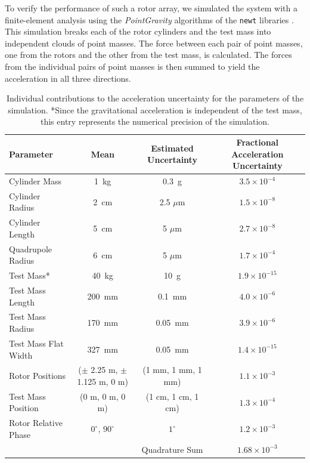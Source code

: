 \documentclass[superscriptaddress, twocolumn, prd]{revtex4-1}
\begin{document}
To verify the performance of such a rotor array, we simulated the system with a finite-element analysis using the \textit{PointGravity} algorithms of the \texttt{newt} libraries \cite{Hagedorn, pgURL}. This simulation breaks each of the rotor cylinders and the test mass into independent clouds of point masses. The force between each pair of point masses, one from the rotors and the other from the test mass, is calculated. The forces from the individual pairs of point masses is then summed to yield the acceleration in all three directions. 
\begin{widetext}
\begingroup
\setlength{\tabcolsep}{10pt} %
\renewcommand{\arraystretch}{1.5} %

\begin{table}[h!]
\begin{center}
\begin{tabular}{ |l|c|c|c| }
\hline
 Parameter & Mean & Estimated Uncertainty & Fractional Acceleration Uncertainty\\
 \hline

Cylinder Mass & 1~kg & 0.3~g & $3.5\times10^{-4}$\\
Cylinder Radius & 2~cm & 2.5 $\mu$m & $1.5\times10^{-8}$\\
Cylinder Length & 5~cm & 5 $\mu$m & $2.7\times10^{-8}$\\
Quadrupole Radius & 6~cm & 5 $\mu$m &$1.7\times10^{-4}$\\
Test Mass* & 40~kg & 10~g & $1.9\times10^{-15}$\\
Test Mass Length & 200~mm & 0.1~mm& $4.0\times10^{-6}$\\
Test Mass Radius & 170~mm & 0.05~mm& $3.9\times10^{-6}$\\
Test Mass Flat Width & 327~mm & 0.05~mm&$1.4\times10^{-15}$\\
Rotor Positions & ($\pm$ 2.25 m, $\pm$ 1.125 m, 0 m) & (1 mm, 1 mm, 1 mm) &$1.1\times10^{-3}$\\
Test Mass Position & (0 m, 0 m, 0 m) & (1 cm, 1 cm, 1 cm) &$1.3\times10^{-4}$\\
Rotor Relative Phase & $0^\circ$, $90^\circ$ & $1^\circ$ & $1.2\times10^{-3}$\\
 \hline
 \hline
& &Quadrature Sum  &$1.68\times10^{-3}$\\
\hline
 \end{tabular}
 \caption{Individual contributions to the acceleration uncertainty for the parameters of the simulation. *Since the gravitational acceleration is independent of the test mass, this entry represents the numerical precision of the simulation.}\label{uncert}
 \end{center}

\end{table}
\endgroup
\end{widetext}
\end{document}
